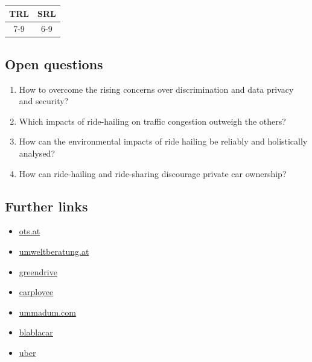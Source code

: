 \documentclass[
]{book}
\providecommand{\tightlist}{%
  \setlength{\itemsep}{0pt}\setlength{\parskip}{0pt}}
\begin{document}
\begin{longtable}[]{@{}cc@{}}
\toprule
TRL & SRL\tabularnewline
\midrule
\endhead
7-9 & 6-9\tabularnewline
\bottomrule
\end{longtable}

\hypertarget{open-questions-45}{%
\subsection*{Open questions}\label{open-questions-45}}

\begin{enumerate}
\def\labelenumi{\arabic{enumi}.}
\tightlist
\item
  How to overcome the rising concerns over discrimination and data privacy and security?
\item
  Which impacts of ride-hailing on traffic congestion outweigh the others?
\item
  How can the environmental impacts of ride hailing be reliably and holistically analysed?
\item
  How can ride-hailing and ride-sharing discourage private car ownership?
\end{enumerate}

\hypertarget{further-links-37}{%
\subsection*{Further links}\label{further-links-37}}

\begin{itemize}
\tightlist
\item
  \href{https://www.ots.at/presseaussendung/OTS_20210113_OTS0026/free-now-will-als-erste-mobilitaetsplattform-in-europa-bis-2030-null-emissionen-erreichen}{ots.at}
\item
  \href{https://www.umweltberatung.at/carsharing-mitfahrboersen}{umweltberatung.at}
\item
  \href{https://greendrive.at/premium/\#benefits}{greendrive}
\item
  \href{https://www.carployee.com/\#start-section}{carployee}
\item
  \href{https://ummadum.com/}{ummadum.com}
\item
  \href{https://www.blablacar.de/}{blablacar}
\item
  \href{https://www.uber.com/at/de/}{uber}
\end{itemize}
\end{document}
